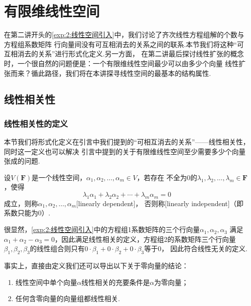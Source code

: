 \chapter{有限维线性空间}

在第二讲开头的\autoref{exp:2:线性空间引入}中，我们讨论了齐次线性方程组解的个数与方程组系数矩阵
行向量间没有可互相消去的关系之间的联系.本节我们将这种``可互相消去的关系''进行形式化定义.另一方面，
在第二讲最后探讨线性扩张的概念时，一个很自然的问题便是：一个有限维线性空间最少可以由多少个向量
线性扩张而来？循此路径，我们将在本讲探寻线性空间的最基本的结构属性.

\section{线性相关性}
\subsection{线性相关性的定义}
本节我们将形式化定义在引言中我们提到的``可相互消去的关系''——线性相关性，同时这一定义也可以解决
引言中提到的关于有限维线性空间至少需要多少个向量张成的问题.
\begin{definition}
    设$V(\mathbf{F})$是一个线性空间，$\alpha_1,\alpha_2,\ldots,\alpha_m\in V$，若存在
    不全为0的$\lambda_1,\lambda_2,\ldots,\lambda_m\in\mathbf{F}$，使得
    \[\lambda_1\alpha_1+\lambda_2\alpha_2+\cdots+\lambda_m\alpha_m=0\]
    成立，则称$\alpha_1,\alpha_2,\ldots,\alpha_m$[linearly dependent]，
    否则称[linearly independent]（即系数只能为0）.
\end{definition}

很显然，\autoref{exp:2:线性空间引入}中的方程组1系数矩阵的三个行向量$\alpha_1,\alpha_2,\alpha_3$
满足$\alpha_1+\alpha_2-\alpha_3=0$，因此满足线性相关的定义，方程组2的系数矩阵三个行向量
$\beta_1,\beta_2,\beta_3$的线性组合则只有$0\cdot\beta_1+0\cdot\beta_2+0\cdot\beta_3$等于0，
因此符合线性无关的定义.

事实上，直接由定义我们还可以导出以下关于零向量的结论：
\begin{enumerate}
    \item 线性空间中单个向量$\alpha$线性相关的充要条件是$\alpha$为零向量；

    \item 任何含零向量的向量组都线性相关.
\end{enumerate}

